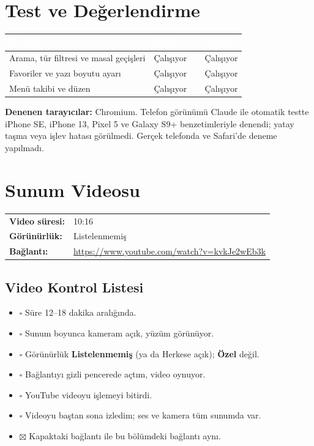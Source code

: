 \documentclass[12pt,a4paper]{article}
\newcommand{\youtubelink}{\url{https://www.youtube.com/watch?v=kvkJe2wEb3k}}
\begin{document}
\section{Test ve Değerlendirme}
\begin{center}
\begin{tabular}{@{}p{6cm}p{3.4cm}p{3.4cm}@{}}
\toprule
\rowcolor{ana}\textcolor{white}{\textbf{Özellik}} & \textcolor{white}{\textbf{Bilgisayar}} & \textcolor{white}{\textbf{Telefon}} \\
\midrule
\relax Arama, tür filtresi ve masal geçişleri & Çalışıyor & Çalışıyor \\
\relax Favoriler ve yazı boyutu ayarı & Çalışıyor & Çalışıyor \\
\relax Menü takibi ve düzen & Çalışıyor & Çalışıyor \\
\bottomrule
\end{tabular}
\end{center}

\textbf{Denenen tarayıcılar:} Chromium. Telefon görünümü Claude ile otomatik testte iPhone SE, iPhone 13, Pixel 5 ve Galaxy S9+ benzetimleriyle denendi; yatay taşma veya işlev hatası görülmedi. Gerçek telefonda ve Safari'de deneme yapılmadı.

\section{Sunum Videosu}
\begin{center}
\begin{tabular}{@{}ll@{}}
\textbf{Video süresi:} & 10:16 \quad  \\
\textbf{Görünürlük:} & Listelenmemiş \\
\textbf{Bağlantı:} & \youtubelink \\
\end{tabular}
\end{center}

\subsection{Video Kontrol Listesi}
\begin{itemize}[label={}]
  \item $\square$ Süre 12--18 dakika aralığında.
  \item $\square$ Sunum boyunca kameram açık, yüzüm görünüyor.
  \item $\square$ Görünürlük \textbf{Listelenmemiş} (ya da Herkese açık); \textbf{Özel} değil.
  \item $\square$ Bağlantıyı gizli pencerede açtım, video oynuyor.
  \item $\square$ YouTube videoyu işlemeyi bitirdi.
  \item $\square$ Videoyu baştan sona izledim; ses ve kamera tüm sunumda var.
  \item $\boxtimes$ Kapaktaki bağlantı ile bu bölümdeki bağlantı aynı.
\end{itemize}
\end{document}
